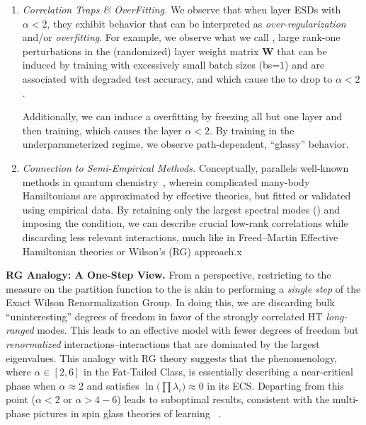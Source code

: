 \begin{enumerate}[label=\Alph*.]
\item
  \emph{ Correlation Traps \& OverFitting.}
  We  observe that when layer ESDs with $\alpha<2$, they exhibit behavior that can be interpreted as
  \emph{over-regularization} and/or  \emph{overfitting}.
  For example, we observe what we call \emph{\CorrelationTraps}, large rank-one perturbations in the
  (randomized)  layer weight matrix $\mathbf{W}$ that can be induced by training with
  excessively small batch sizes (bs=$1$) and are associated with degraded test accuracy,
  and which cause the \HTSR to drop to $\alpha<2$.
  
  Additionally, we can induce a overfitting by freezing all but one layer and
  then training, which causes the layer $\alpha<2$.  By training in
  the underparameterized regime, we observe path-dependent, “glassy” behavior.

\item 
\emph{Connection to Semi-Empirical Methods.}
Conceptually, \SETOL parallels well-known \emph{\SemiEmpirical} methods in quantum chemistry~\cite{Martin1996HighlyAA, 
martin1996redesigning,martin_reparametrizing_1998}, wherein complicated many-body Hamiltonians are approximated by 
effective theories, but fitted or validated using empirical data. By retaining only the largest spectral modes 
(\ECS) and imposing the \TRACELOG condition, we can describe crucial low-rank correlations while discarding less 
relevant interactions, much like in Freed--Martin Effective Hamiltonian theories or Wilson’s \RenormalizationGroup 
(RG) approach.x
\end{enumerate}

\vspace{1em}
\noindent
\textbf{RG Analogy: A One-Step View.}
From a \RenormalizationGroup perspective, restricting to the measure on the partition function to
the \ECS is akin to performing a \emph{single step} of the Exact Wilson Renormalization Group.
In doing this, we are discarding bulk “uninteresting” degrees of freedom in favor of the strongly correlated 
HT \emph{long-ranged} modes. This leads to an effective model with fewer degrees of freedom but 
\emph{renormalized} interactions--interactions that are dominated by the largest eigenvalues.
This analogy with RG theory suggests that the \HTSR phenomenology, where $\alpha\in[2,6]$ in the Fat-Tailed
\Universality Class, is essentially describing a near-critical phase  when
$\alpha \approx 2$ and satisfies $\ln\!\bigl(\prod \lambda_i\bigr)\approx 0$ in its ECS.
Departing from  this point ($\alpha<2$ or $\alpha>4-6$) leads to suboptimal results, consistent with the multi-phase 
pictures in \STATMECH spin glass theories of learning~\cite{SST92,Gardner_1988} .

